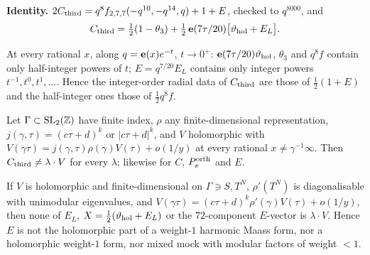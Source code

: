 \noindent\textbf{Identity.} $2C_{\mathrm{third}}=q^8f_{2,7,7}(-q^{10},-q^{14},q)+1+E$, checked to $q^{8000}$, and
\[C_{\mathrm{third}}=\tfrac12(1-\theta_3)+\tfrac12\,\mathbf{e}(7\tau/20)\bigl[\vartheta_{\rm hol}+E_L\bigr].\]

\begin{lemma}\label{lem:parity}
At every rational $x$, along $q=\mathbf{e}(x)e^{-t}$, $t\to0^+$: $\mathbf{e}(7\tau/20)\vartheta_{\rm hol}$, $\theta_3$ and $q^8f$ contain only half-integer powers of $t$;
$E=q^{7/20}E_L$ contains only integer powers $t^{-1},t^0,t^1,\dots$. Hence the integer-order radial data of $C_{\mathrm{third}}$ are those of $\tfrac12(1+E)$ and
the half-integer ones those of $\tfrac12q^8f$.
\end{lemma}

\begin{theorem}\label{thm:O2}
Let $\Gamma\subset\mathrm{SL}_2(\mathbb{Z})$ have finite index, $\rho$ any finite-dimensional representation, $j(\gamma,\tau)=(c\tau+d)^k$ or $|c\tau+d|^k$, and $V$ holomorphic with
$V(\gamma\tau)=j(\gamma,\tau)\rho(\gamma)V(\tau)+o(1/y)$ at every rational $x\neq\gamma^{-1}\infty$. Then $C_{\mathrm{third}}\neq\lambda\cdot V$ for every $\lambda$; likewise for
$C$, $P^{\mathrm{orth}}_s$ and $E$.
\end{theorem}

\begin{theorem}\label{thm:O1}
If $V$ is holomorphic and finite-dimensional on $\Gamma\ni S,T^N$, $\rho'(T^N)$ is diagonalisable with unimodular eigenvalues, and
$V(\gamma\tau)=(c\tau+d)^k\rho'(\gamma)V(\tau)+o(1/y)$, then none of $E_L$, $X=\tfrac12(\vartheta_{\rm hol}+E_L)$ or the $72$-component $E$-vector is $\lambda\cdot V$.
Hence $E$ is not the holomorphic part of a weight-$1$ harmonic Maass form, nor a holomorphic weight-$1$ form, nor mixed mock with modular factors of weight $<1$.
\end{theorem}

